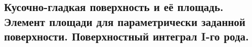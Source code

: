 \subsection{Кусочно-гладкая поверхность и её площадь. Элемент площади для параметрически заданной поверхности. Поверхностный интеграл I-го рода.}